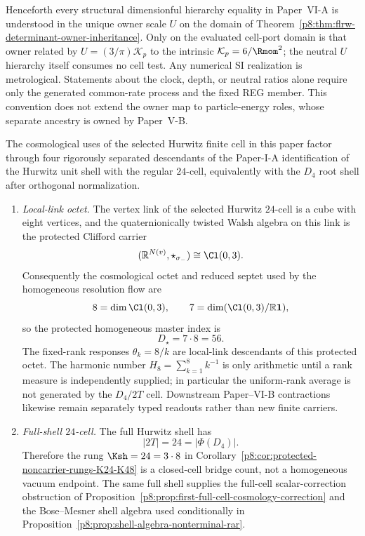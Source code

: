 \documentclass[12pt,a4paper]{article}
\begin{document}
Henceforth every structural dimensionful hierarchy equality in Paper~VI-A is understood in the unique owner scale \(U\) on the domain of Theorem~\ref{p8:thm:flrw-determinant-owner-inheritance}.  Only on the evaluated cell-port domain is that owner related by $U=(3/\pi)\mathcal K_p$ to the intrinsic $\mathcal K_p=6/\Rmom^2$; the neutral $U$ hierarchy itself consumes no cell test.  Any numerical SI realization is metrological.  Statements about the clock, depth, or neutral ratios alone require only the generated common-rate process and the fixed REG member.  This convention does not extend the owner map to particle-energy roles, whose separate ancestry is owned by Paper~V-B.

\begin{proposition}
\label{p8:prop:d4-cosmology-origin}
The cosmological uses of the selected Hurwitz finite cell in this paper factor through four rigorously separated descendants of the Paper-I-A identification of the Hurwitz unit shell with the regular $24$-cell, equivalently with the $D_4$ root shell after orthogonal normalization.

\begin{enumerate}
\item[\textup{(L)}] \emph{Local-link octet.}  The vertex link of the selected Hurwitz $24$-cell is a cube with eight vertices, and the quaternionically twisted Walsh algebra on this link is the protected Clifford carrier
\[
(\mathbb R^{N(v)},\star_{\sigma_-})\cong\Cl(0,3).
\]
Consequently the cosmological octet and reduced septet used by the homogeneous resolution flow are
\[
8=\dim\Cl(0,3),\qquad
7=\dim(\Cl(0,3)/\mathbb R\mathbf 1),
\]
so the protected homogeneous master index is
\[
D_\star=7\cdot8=56.
\]
The fixed-rank responses $\theta_k=8/k$ are local-link descendants of this protected octet.  The harmonic number $H_8=\sum_{k=1}^8k^{-1}$ is only arithmetic until a rank measure is independently supplied; in particular the uniform-rank average is not generated by the $D_4/2T$ cell.  Downstream Paper--VI-B contractions likewise remain separately typed readouts rather than new finite carriers.

\item[\textup{(F)}] \emph{Full-shell $24$-cell.}  The full Hurwitz shell has
\[
|2T|=24=|\Phi(D_4)|.
\]
Therefore the rung $\Ksh=24=3\cdot8$ in Corollary~\ref{p8:cor:protected-noncarrier-rungs-K24-K48} is a closed-cell bridge count, not a homogeneous vacuum endpoint.  The same full shell supplies the full-cell scalar-correction obstruction of Proposition~\ref{p8:prop:first-full-cell-cosmology-correction} and the Bose--Mesner shell algebra used conditionally in Proposition~\ref{p8:prop:shell-algebra-nonterminal-rar}.


\end{enumerate}
\end{proposition}
\end{document}
